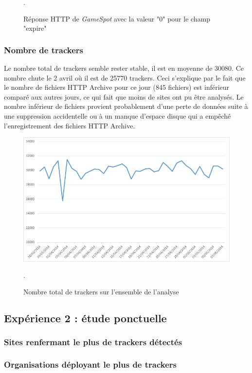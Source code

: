 \begin{figure}[h]
	\centering
	
	\caption{\label{bad_field_gamespot}Réponse HTTP de \textit{GameSpot} avec la valeur "0" pour le champ "expire"}.
\end{figure}

\subsubsection{Nombre de trackers}
Le nombre total de trackers semble rester stable, il est en moyenne de 30080. Ce nombre chute le 2 avril où il est de 25770 trackers. Ceci s'explique par le fait que le nombre de fichiers HTTP Archive pour ce jour (845 fichiers) est inférieur comparé aux autres jours, ce qui fait que moins de sites ont pu être analysés. Le nombre inférieur de fichiers provient probablement d'une perte de données suite à une suppression accidentelle ou à un manque d'espace disque qui a empêché l'enregistrement des fichiers HTTP Archive.

\begin{figure}[h]
	\centering
	\includegraphics[scale=.8]{graphiques/Exp1_parser_total_trackers.png}
	\caption{\label{Exp1_parser_total_trackers}Nombre total de trackers sur l'ensemble de l'analyse}.
\end{figure}
\subsection{Expérience 2 : étude ponctuelle}

\subsubsection{Sites renfermant le plus de trackers détectés}

\subsubsection{Organisations déployant le plus de trackers}
